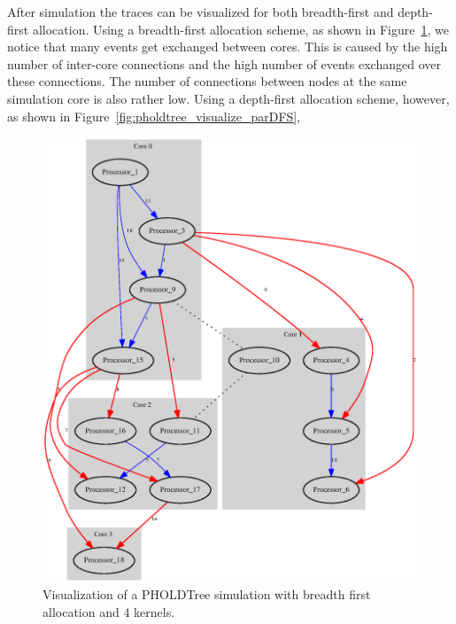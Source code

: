 After simulation the traces can be visualized for both breadth-first and depth-first allocation.
Using a breadth-first allocation scheme, as shown in Figure~\ref{fig:pholdtree_visualize_parBFS}, we notice that many events get exchanged between cores.
This is caused by the high number of inter-core connections and the high number of events exchanged over these connections.
The number of connections between nodes at the same simulation core is also rather low.
Using a depth-first allocation scheme, however, as shown in Figure~\ref{fig:pholdtree_visualize_parDFS},

\begin{figure}
    \center
    \includegraphics[width=\columnwidth]{fig/pholdtreed1n3t5000c4BFS.eps}
    \caption{Visualization of a PHOLDTree simulation with breadth first allocation and 4 kernels.}
    \label{fig:pholdtree_visualize_parBFS}
\end{figure}

